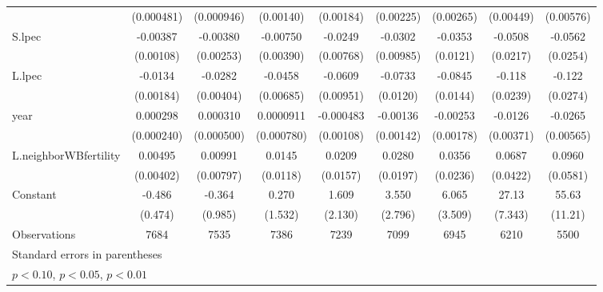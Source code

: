 \begin{table}[htbp]
\begin{tabular}{l*{8}{c}}
                    &  (0.000481)         &  (0.000946)         &   (0.00140)         &   (0.00184)         &   (0.00225)         &   (0.00265)         &   (0.00449)         &   (0.00576)         \\
[1em]
S.lpec              &    -0.00387\sym{***}&    -0.00380         &    -0.00750\sym{*}  &     -0.0249\sym{***}&     -0.0302\sym{***}&     -0.0353\sym{***}&     -0.0508\sym{**} &     -0.0562\sym{**} \\
                    &   (0.00108)         &   (0.00253)         &   (0.00390)         &   (0.00768)         &   (0.00985)         &    (0.0121)         &    (0.0217)         &    (0.0254)         \\
[1em]
L.lpec              &     -0.0134\sym{***}&     -0.0282\sym{***}&     -0.0458\sym{***}&     -0.0609\sym{***}&     -0.0733\sym{***}&     -0.0845\sym{***}&      -0.118\sym{***}&      -0.122\sym{***}\\
                    &   (0.00184)         &   (0.00404)         &   (0.00685)         &   (0.00951)         &    (0.0120)         &    (0.0144)         &    (0.0239)         &    (0.0274)         \\
[1em]
year                &    0.000298         &    0.000310         &   0.0000911         &   -0.000483         &    -0.00136         &    -0.00253         &     -0.0126\sym{***}&     -0.0265\sym{***}\\
                    &  (0.000240)         &  (0.000500)         &  (0.000780)         &   (0.00108)         &   (0.00142)         &   (0.00178)         &   (0.00371)         &   (0.00565)         \\
[1em]
L.neighborWBfertility&     0.00495         &     0.00991         &      0.0145         &      0.0209         &      0.0280         &      0.0356         &      0.0687         &      0.0960         \\
                    &   (0.00402)         &   (0.00797)         &    (0.0118)         &    (0.0157)         &    (0.0197)         &    (0.0236)         &    (0.0422)         &    (0.0581)         \\
[1em]
Constant            &      -0.486         &      -0.364         &       0.270         &       1.609         &       3.550         &       6.065\sym{*}  &       27.13\sym{***}&       55.63\sym{***}\\
                    &     (0.474)         &     (0.985)         &     (1.532)         &     (2.130)         &     (2.796)         &     (3.509)         &     (7.343)         &     (11.21)         \\
\hline
Observations        &        7684         &        7535         &        7386         &        7239         &        7099         &        6945         &        6210         &        5500         \\
\hline\hline
\multicolumn{9}{l}{\footnotesize Standard errors in parentheses}\\
\multicolumn{9}{l}{\footnotesize \sym{*} \(p<0.10\), \sym{**} \(p<0.05\), \sym{***} \(p<0.01\)}\\
\end{tabular}
\end{table}
